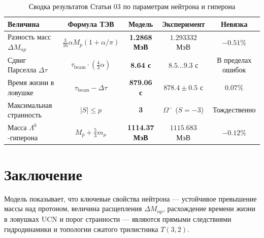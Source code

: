 \documentclass[11pt,a4paper]{article}
\theoremstyle{definition}
\theoremstyle{remark}
\begin{document}
\begin{table}[h]
\centering
\small
\caption{Сводка результатов Статьи 03 по параметрам нейтрона и гиперона}
\label{tab:neutron_summary}
\vspace{2mm}
\begin{tabular}{lcccc}
\toprule
\textbf{Величина} & \textbf{Формула ТЭВ} & \textbf{Модель} & \textbf{Эксперимент} & \textbf{Невязка} \\
\midrule
Разность масс $\Delta M_{np}$ & $\frac{3}{16}\alpha M_p (1 + \alpha/\pi)$ & \textbf{1.2868 МэВ} & $1.293332$ МэВ & $-0.51\%$ \\
Сдвиг Парселла $\Delta\tau$ & $\tau_{\mathrm{beam}} \cdot (\frac{4}{3}\alpha)$ & \textbf{8.64 с} & $8.5\dots 9.3$ с & В пределах ошибок \\
Время жизни в ловушке & $\tau_{\mathrm{beam}} - \Delta\tau$ & \textbf{879.06 с} & $878.4 \pm 0.5$ с & $0.07\%$ \\
Максимальная странность & $|S| \le p$ & \textbf{3} & $\Omega^-$ ($S=-3$) & Тождественно \\
Масса $\Lambda^0$-гиперона & $M_p + \frac{5}{3}m_\mu$ & \textbf{1114.37 МэВ} & $1115.683$ МэВ & $-0.12\%$ \\
\bottomrule
\end{tabular}
\end{table}

\section{Заключение}
Модель показывает, что ключевые свойства нейтрона — устойчивое превышение массы над протоном, величина расщепления $\Delta M_{np}$, расхождение времени жизни в ловушках UCN и порог странности — являются прямыми следствиями гидродинамики и топологии сжатого трилистника $T(3,2)$.
\end{document}
